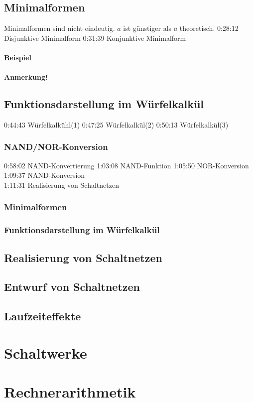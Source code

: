 \documentclass[a4paper]{scrartcl}
\begin{document}
			\subsection{Minimalformen} 
			Minimalformen sind nicht eindeutig. \( a \) ist günstiger als \( \overline{a} \) theoretisch.
			0:28:12 Disjunktive Minimalform 
			0:31:39 Konjunktive Minimalform
			 \paragraph{Beispiel}
			 \paragraph{Anmerkung!}
			 \subsection{Funktionsdarstellung im Würfelkalkül}
			 
			0:44:43 Würfelkalkühl(1) 
			0:47:25 Würfelkalkül(2) 
			0:50:13 Würfelkalkül(3) 
			\subsubsection{NAND/NOR-Konversion}
			0:58:02 NAND-Konvertierung 
			1:03:08 NAND-Funktion 
			1:05:50 NOR-Konversion 
			1:09:37 NAND-Konversion \\
			1:11:31 Realisierung von Schaltnetzen 
			
			\subsubsection{Minimalformen}
			\subsubsection{Funktionsdarstellung im Würfelkalkül}

			
		\subsection{Realisierung von Schaltnetzen}
		\subsection{Entwurf von Schaltnetzen}
		\subsection{Laufzeiteffekte}
	
	\section{Schaltwerke}
	\section{Rechnerarithmetik}
	
\end{document}
